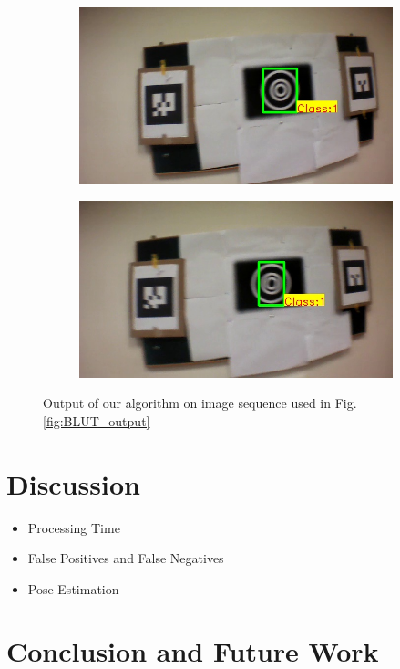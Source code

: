\documentclass[runningheads]{llncs}
\begin{document}
\begin{figure}
\begin{subfigure}[b]{.19\textwidth}
\end{subfigure}
\begin{subfigure}[b]{.19\textwidth}
\includegraphics[width=\linewidth]{output14.jpg}
\end{subfigure}
\begin{subfigure}[b]{.19\textwidth}
\includegraphics[width=\linewidth]{output15.jpg}
\end{subfigure}
\caption{Output of our algorithm on image sequence used in
Fig. \ref{fig:BLUT_output}}
\label{fig:our_output}
\end{figure}

\section{Discussion}
\begin{itemize}
\item Processing Time
\item False Positives and False Negatives
\item Pose Estimation
\end{itemize}
\section{Conclusion and Future Work}



\end{document}
